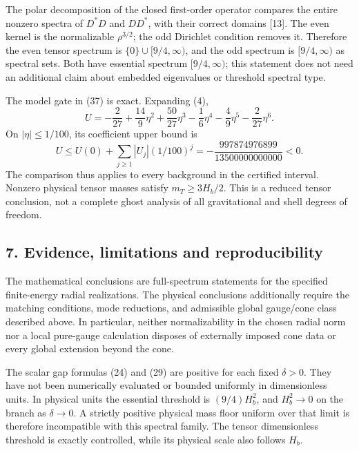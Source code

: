 \documentclass[
  11pt,
]{article}
\begin{document}
The polar decomposition of the closed first-order operator compares the
entire nonzero spectra of \(D^*D\) and \(DD^*\), with their correct
domains {[}13{]}. The even kernel is the normalizable \(\rho^{3/2}\);
the odd Dirichlet condition removes it. Therefore the even tensor
spectrum is \(\{0\}\cup[9/4,\infty)\), and the odd spectrum is
\([9/4,\infty)\) as spectral sets. Both have essential spectrum
\([9/4,\infty)\); this statement does not need an additional claim about
embedded eigenvalues or threshold spectral type.

The model gate in (37) is exact. Expanding (4), \[
 U=-\frac2{27}+\frac{14}{9}\eta^2+\frac{50}{27}\eta^3
 -\frac16\eta^4-\frac49\eta^5-\frac2{27}\eta^6.
 \tag{38}
\] On \(|\eta|\le1/100\), its coefficient upper bound is \[
 U\le U(0)+\sum_{j\ge1}|U_j|(1/100)^j
 =-\frac{997874976899}{13500000000000}<0.
 \tag{39}
\] The comparison thus applies to every background in the certified
interval. Nonzero physical tensor masses satisfy \(m_T\ge3H_b/2\). This
is a reduced tensor conclusion, not a complete ghost analysis of all
gravitational and shell degrees of freedom.

\subsection{7. Evidence, limitations and
reproducibility}\label{evidence-limitations-and-reproducibility}

The mathematical conclusions are full-spectrum statements for the
specified finite-energy radial realizations. The physical conclusions
additionally require the matching conditions, mode reductions, and
admissible global gauge/cone class described above. In particular,
neither normalizability in the chosen radial norm nor a local pure-gauge
calculation disposes of externally imposed cone data or every global
extension beyond the cone.

The scalar gap formulas (24) and (29) are positive for each fixed
\(\delta>0\). They have not been numerically evaluated or bounded
uniformly in dimensionless units. In physical units the essential
threshold is \((9/4)H_b^2\), and \(H_b^2\to0\) on the branch as
\(\delta\to0\). A strictly positive physical mass floor uniform over
that limit is therefore incompatible with this spectral family. The
tensor dimensionless threshold is exactly controlled, while its physical
scale also follows \(H_b\).
\end{document}
